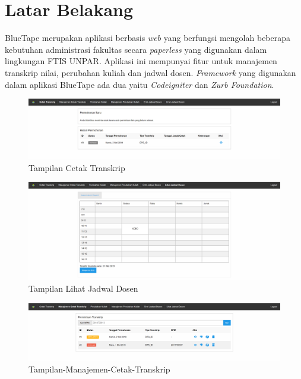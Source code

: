 \documentclass[a4paper,twoside]{article}
\begin{document}
	\section{Latar Belakang}
	BlueTape merupakan aplikasi berbasis \textit{web} yang berfungsi mengolah beberapa kebutuhan administrasi fakultas secara \textit{paperless} yang digunakan dalam lingkungan FTIS UNPAR.  Aplikasi ini mempunyai fitur untuk manajemen transkrip nilai, perubahan kuliah dan jadwal dosen. \textit{Framework} yang digunakan dalam aplikasi BlueTape ada dua yaitu \textit{Codeigniter} dan \textit{Zurb Foundation}.  
	
	\begin{figure}[h]
		\includegraphics [scale=0.5] {Tampilan-Cetak-Transkrip.PNG}
		\caption{Tampilan Cetak Transkrip}
	\end{figure}
	
	\begin{figure}[h]
		\includegraphics [scale=0.5] {Tampilan-Lihat-Jadwal-Dosen.PNG}
		\caption{Tampilan Lihat Jadwal Dosen}
	\end{figure}
	
	\begin{figure}[h]
		\includegraphics [scale=0.5] {Tampilan-Manajemen-Cetak-Transkrip.PNG}
		\caption{Tampilan-Manajemen-Cetak-Transkrip}
	\end{figure}
	
\end{document}
